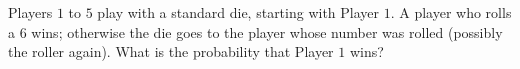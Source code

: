 Players $1$ to $5$ play with a standard die, starting with Player $1$. A player who rolls a $6$ wins; otherwise the die goes to the player whose number was rolled (possibly the roller again). What is the probability that Player $1$ wins?

